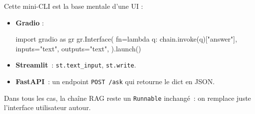 \documentclass[11pt,a4paper]{article}
\begin{document}
Cette mini-CLI est la base mentale d'une UI :
\begin{itemize}[leftmargin=*]
  \item \textbf{Gradio} :
\begin{pythoncode}
import gradio as gr
gr.Interface(
    fn=lambda q: chain.invoke(q)["answer"],
    inputs="text", outputs="text",
).launch()
\end{pythoncode}
  \item \textbf{Streamlit}~: \texttt{st.text\_input}, \texttt{st.write}.
  \item \textbf{FastAPI}~: un endpoint \texttt{POST /ask} qui retourne
        le dict en JSON.
\end{itemize}

Dans tous les cas, la chaîne RAG reste un \texttt{Runnable} inchangé~:
on remplace juste l'interface utilisateur autour.
\end{document}
